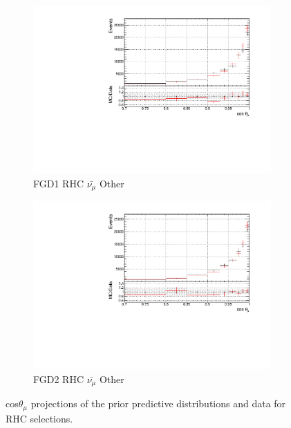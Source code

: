 \begin{figure}[!h]
\begin{subfigure}{0.49\textwidth}
  \centering
  \includegraphics[width=\textwidth]{figs/prioronly1D_t_FGD1_anti-numuCC_other}
  \caption{FGD1 RHC $\bar{\nu_{\mu}}$ Other}
\end{subfigure}
\begin{subfigure}{0.49\textwidth}
  \centering
  \includegraphics[width=\textwidth]{figs/prioronly1D_t_FGD2_anti-numuCC_other}
  \caption{FGD2 RHC $\bar{\nu_{\mu}}$ Other}
\end{subfigure}
\caption{cos$\theta_{\mu}$ projections of the prior predictive distributions and data for RHC \numub selections.}
\label{fig:priorpost_rhc_numub_t}
\end{figure}

